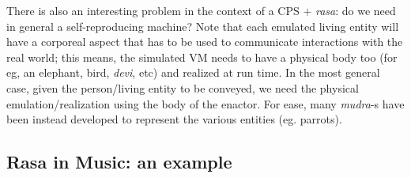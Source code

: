 There is also an interesting problem in the context of a CPS + \textsl{rasa}: do we need in general a self-reproducing machine? Note that each emulated living entity will have a corporeal aspect that has to be used to communicate interactions with the real world; this means, the simulated VM needs to have a physical body too (for eg, an elephant, bird, \textsl{devi}, etc) and realized at run time. In the most general case, given the person/living entity to be conveyed, we need the physical emulation/realization using the body of the enactor. For ease, many \textsl{mudra}-s have been instead developed to represent the various entities (eg. parrots).

\subsection{Rasa in Music: an example}\label{chap7-sec4.3}

